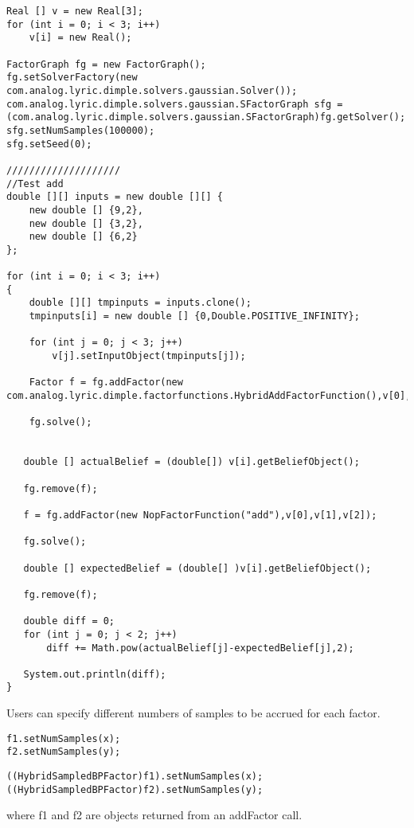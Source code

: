 \ifjava
\begin{lstlisting}
Real [] v = new Real[3];
for (int i = 0; i < 3; i++)
	v[i] = new Real();

FactorGraph fg = new FactorGraph();
fg.setSolverFactory(new com.analog.lyric.dimple.solvers.gaussian.Solver());
com.analog.lyric.dimple.solvers.gaussian.SFactorGraph sfg = (com.analog.lyric.dimple.solvers.gaussian.SFactorGraph)fg.getSolver(); 
sfg.setNumSamples(100000);
sfg.setSeed(0);

////////////////////
//Test add
double [][] inputs = new double [][] {
	new double [] {9,2},
	new double [] {3,2},
	new double [] {6,2}
};

for (int i = 0; i < 3; i++)
{
	double [][] tmpinputs = inputs.clone();
	tmpinputs[i] = new double [] {0,Double.POSITIVE_INFINITY};

	for (int j = 0; j < 3; j++)
		v[j].setInputObject(tmpinputs[j]);

	Factor f = fg.addFactor(new com.analog.lyric.dimple.factorfunctions.HybridAddFactorFunction(),v[0],v[1],v[2]);

	fg.solve();

	
   double [] actualBelief = (double[]) v[i].getBeliefObject();
    
   fg.remove(f);
    
   f = fg.addFactor(new NopFactorFunction("add"),v[0],v[1],v[2]);

   fg.solve();

   double [] expectedBelief = (double[] )v[i].getBeliefObject();
    
   fg.remove(f);
    
   double diff = 0;
   for (int j = 0; j < 2; j++)
	   diff += Math.pow(actualBelief[j]-expectedBelief[j],2);

   System.out.println(diff);
}
\end{lstlisting}
\fi

Users can specify different numbers of samples to be accrued for each factor.

\ifmatlab
\begin{lstlisting}
f1.setNumSamples(x);
f2.setNumSamples(y);
\end{lstlisting}
\fi

\ifjava
\begin{lstlisting}
((HybridSampledBPFactor)f1).setNumSamples(x);
((HybridSampledBPFactor)f2).setNumSamples(y);
\end{lstlisting}
\fi


where f1 and f2 are objects returned from an addFactor call.


